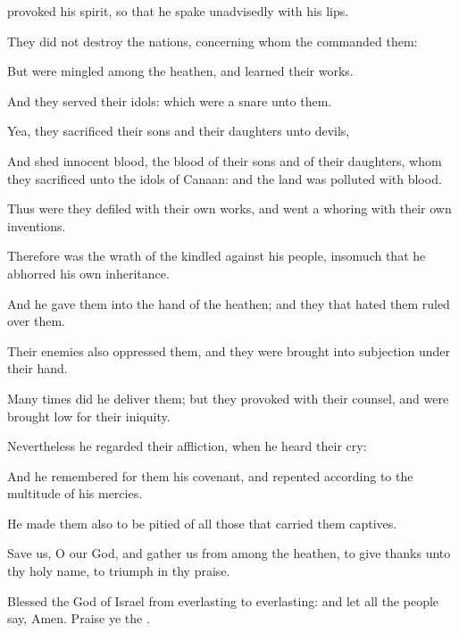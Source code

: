 {provoked his
spirit, so that he spake
unadvisedly with his
lips.
\par }{\BB \par }{\Q {}They did not
destroy the
nations, concerning whom the
{}
commanded them:
\par }{\Q {}But were
mingled among the
heathen, and
learned their
works.
\par }{\Q {}And they
served their
idols: which were a
snare unto them.
\par }{\Q {}Yea, they
sacrificed their
sons and their
daughters unto
devils,
\par }{\Q {}And
shed
innocent
blood,
{} the
blood of their
sons and of their
daughters, whom they
sacrificed unto the
idols of
Canaan: and the
land was
polluted with
blood.
\par }{\Q {}Thus were they
defiled with their own
works, and went a
whoring with their own
inventions.
\par }{\Q {}Therefore was the
wrath of the
{}
kindled against his
people, insomuch that he
abhorred his own
inheritance.
\par }{\Q {}And he
gave them into the
hand of the
heathen; and they that
hated them
ruled over them.
\par }{\Q {}Their
enemies also
oppressed them, and they were brought into
subjection under their
hand.
\par }{\Q {}Many
times did he
deliver them; but they
provoked
{} with their
counsel, and were brought
low for their
iniquity.
\par }{\Q {}Nevertheless he
regarded their
affliction, when he
heard their
cry:
\par }{\Q {}And he
remembered for them his
covenant, and
repented according to the
multitude of his
mercies.
\par }{\Q {}He
made them also to be
pitied
of all those that carried them
captives.
\par }{\Q {}Save us, O
{} our
God, and
gather us from among the
heathen, to give
thanks unto thy
holy
name,
{} to
triumph in thy
praise.
\par }{\Q {}Blessed
{} the
{}
God of
Israel from
everlasting to
everlasting: and let all the
people
say,
Amen.
Praise ye the
{}.

}
